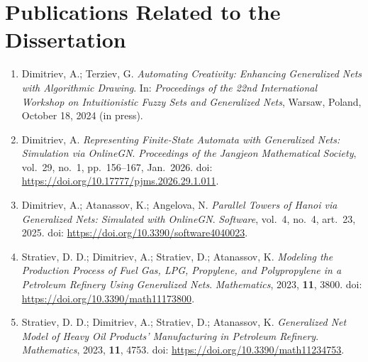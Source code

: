 	\clearpage
	\section*{Publications Related to the Dissertation}
	
	\begin{enumerate}[label=\arabic*.]
		
		\item Dimitriev, A.; Terziev, G.
		\newblock \emph{Automating Creativity: Enhancing Generalized Nets with Algorithmic Drawing}.
		\newblock In: \emph{Proceedings of the 22nd International Workshop on Intuitionistic Fuzzy Sets and Generalized Nets}, Warsaw, Poland, October 18, 2024 (in press).
		
		\item Dimitriev, A.
		\newblock \emph{Representing Finite-State Automata with Generalized Nets: Simulation via OnlineGN}.
		\newblock \emph{Proceedings of the Jangjeon Mathematical Society}, vol.~29, no.~1, pp.~156--167, Jan.~2026.
		\newblock doi: \url{ https://doi.org/10.17777/pjms.2026.29.1.011}.
		
		\item Dimitriev, A.; Atanassov, K.; Angelova, N.
		\newblock \emph{Parallel Towers of Hanoi via Generalized Nets: Simulated with OnlineGN}.
		\newblock \emph{Software}, vol.~4, no.~4, art.~23, 2025.
		\newblock doi: \url{ https://doi.org/10.3390/software4040023}.
		
		\item Stratiev, D. D.; Dimitriev, A.; Stratiev, D.; Atanassov, K.
		\newblock \emph{Modeling the Production Process of Fuel Gas, LPG, Propylene, and Polypropylene in a Petroleum Refinery Using Generalized Nets}.
		\newblock \emph{Mathematics}, 2023, \textbf{11}, 3800.
		\newblock doi: \url{ https://doi.org/10.3390/math11173800}.
		
		\item Stratiev, D. D.; Dimitriev, A.; Stratiev, D.; Atanassov, K.
		\newblock \emph{Generalized Net Model of Heavy Oil Products' Manufacturing in Petroleum Refinery}.
		\newblock \emph{Mathematics}, 2023, \textbf{11}, 4753.
		\newblock doi: \url{ https://doi.org/10.3390/math11234753}.
		
	\end{enumerate}